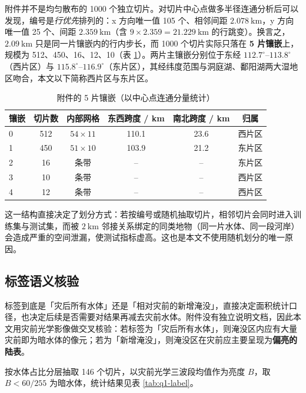 附件并不是均匀散布的 1000 个独立切片。对切片中心点做多半径连通分析后可以发现，编号是\emph{行优先}排列的：x 方向唯一值 105 个、相邻间距 $2.078\ \mathrm{km}$，y 方向唯一值 25 个、间距 $2.359\ \mathrm{km}$（含 $9\times2.359=21.229\ \mathrm{km}$ 的行跳变）。换言之，$2.09\ \mathrm{km}$ 只是同一片镶嵌内的行内步长，而 1000 个切片实际只落在 \textbf{5 片镶嵌}上，规模为 512、450、16、12、10（表 \ref{tab:q1-mosaic}）。两片主镶嵌分别位于东经 $112.7^\circ$--$113.8^\circ$（西片区）与 $115.8^\circ$--$116.9^\circ$（东片区），其经纬度范围与洞庭湖、鄱阳湖两大湿地区吻合，本文以下简称西片区与东片区。

\begin{table}[H]
\centering
\caption{附件的 5 片镶嵌（以中心点连通分量统计）}
\label{tab:q1-mosaic}
\begin{tabular}{lccccc}
\toprule
镶嵌 & 切片数 & 内部网格 & 东西跨度 / km & 南北跨度 / km & 归属 \\
\midrule
0 & 512 & $54\times11$ & 110.1 & 23.6 & 西片区 \\
1 & 450 & $51\times10$ & 103.9 & 21.2 & 东片区 \\
2 & 16  & 条带 & -- & -- & 东片区 \\
3 & 10  & 条带 & -- & -- & 西片区 \\
4 & 12  & 条带 & -- & -- & 西片区 \\
\bottomrule
\end{tabular}
\end{table}

这一结构直接决定了划分方式：若按编号或随机抽取切片，相邻切片会同时进入训练集与测试集，而被 $2\ \mathrm{km}$ 邻接关系绑定的同类地物（同一片水体、同一段河岸）会造成严重的空间泄漏，使测试指标虚高。这也是本文不使用随机划分的唯一原因。

\subsection{标签语义核验}
\label{sec:q1-semantics}

标签到底是「灾后所有水体」还是「相对灾前的新增淹没」，直接决定面积统计口径，也决定后续是否需要对结果再减去灾前水体。附件没有独立说明文档，因此本文用灾前光学影像做交叉核验：若标签为「灾后所有水体」，则淹没区内应有大量灾前即为暗水体的像元；若为「新增淹没」，则淹没区在灾前应主要呈现为\textbf{偏亮的陆表}。

按水体占比分层抽取 146 个切片，以灾前光学三波段均值作为亮度 $B$，取 $B<60/255$ 为暗水体，统计结果见表 \ref{tab:q1-label}。

